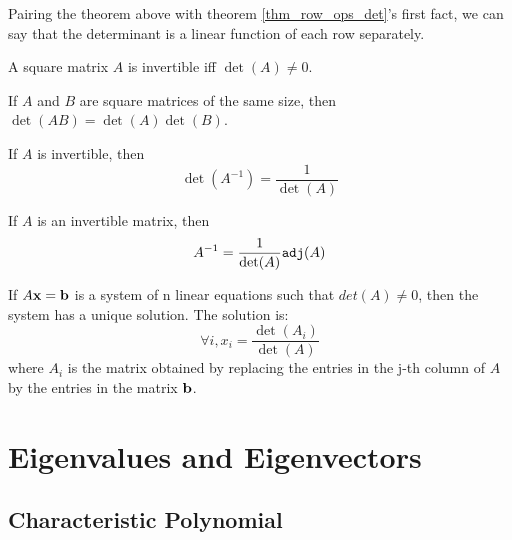 \documentclass{report}
\begin{document}
			Pairing the theorem above with theorem \ref{thm_row_ops_det}'s first fact, we can say that the determinant is a linear function of each row separately.
			
			\begin{thm}
				A square matrix $A$ is invertible iff $\det(A) \ne 0$.
			\end{thm}
			
			\begin{thm}
				If $A$ and $B$ are square matrices of the same size, then $\det(AB)=\det(A)\det(B)$.
			\end{thm}
			
			\begin{thm}
				If $A$ is invertible, then
				\begin{displaymath}
					\det(A^{-1})=\frac{1}{\det(A)}
				\end{displaymath}
			\end{thm}
			
			\begin{thm}
				If $A$ is an invertible matrix, then
				\begin{displaymath}
					A^{-1}=\frac{1}{\det(A)}\verb|adj|(A)
				\end{displaymath}
			\end{thm}
			
			\begin{thm}
				If $A\bf{x}=\bf{b}$ is a system of n linear equations such that $det(A)\ne0$, then the system has a unique solution. The solution is:
				\begin{displaymath}
					\forall i, x_i=\frac{\det(A_i)}{\det(A)}
				\end{displaymath}
				where $A_i$ is the matrix obtained by replacing the entries in the j-th column of $A$ by the entries in the matrix $\bf{b}$.
			\end{thm}
		
	\section{Eigenvalues and Eigenvectors}
		\subsection{Characteristic Polynomial}
		
		\subsection{}
		
\end{document}
